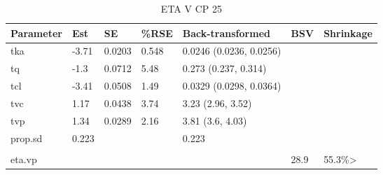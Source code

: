\begin{table}
\centering\centering
\caption{ETA V CP 25}
\centering
\fontsize{8}{10}\selectfont
\begin{tabular}[t]{lllllll}
\toprule
\textbf{Parameter} & \textbf{Est} & \textbf{SE} & \textbf{\%RSE} & \textbf{Back-transformed} & \textbf{BSV} & \textbf{Shrinkage}\\
\midrule
tka & -3.71 & 0.0203 & 0.548 & 0.0246 (0.0236, 0.0256) &  & \\
\midrule
tq & -1.3 & 0.0712 & 5.48 & 0.273 (0.237, 0.314) &  & \\
\midrule
tcl & -3.41 & 0.0508 & 1.49 & 0.0329 (0.0298, 0.0364) &  & \\
\midrule
tvc & 1.17 & 0.0438 & 3.74 & 3.23 (2.96, 3.52) &  & \\
\midrule
tvp & 1.34 & 0.0289 & 2.16 & 3.81 (3.6, 4.03) &  & \\
\midrule
prop.sd & 0.223 &  &  & 0.223 &  & \\
\midrule\\
eta.vp &  &  &  &  & 28.9 & 55.3\%>\\
\bottomrule
\end{tabular}
\end{table}